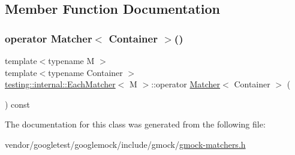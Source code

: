 \subsection{Member Function Documentation}
\mbox{\label{classtesting_1_1internal_1_1_each_matcher_a81bd8bb67346dd2c07c7bf85a1b2d062}} 
\subsubsection{\texorpdfstring{operator Matcher$<$ Container $>$()}{operator Matcher< Container >()}}
{\footnotesize\ttfamily template$<$typename M $>$ \\
template$<$typename Container $>$ \\
\hyperlink{classtesting_1_1internal_1_1_each_matcher}{testing\+::internal\+::\+Each\+Matcher}$<$ M $>$\+::operator \hyperlink{classtesting_1_1_matcher}{Matcher}$<$ Container $>$ (\begin{DoxyParamCaption}{ }\end{DoxyParamCaption}) const\hspace{0.3cm}{\ttfamily [inline]}}



The documentation for this class was generated from the following file\+:\begin{DoxyCompactItemize}
\item 
vendor/googletest/googlemock/include/gmock/\hyperlink{gmock-matchers_8h}{gmock-\/matchers.\+h}\end{DoxyCompactItemize}
